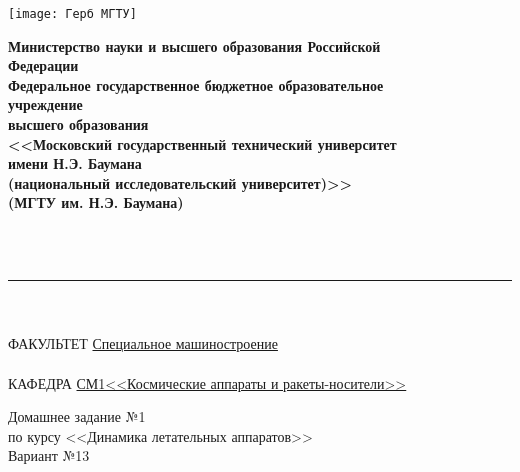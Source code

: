 \begin{minipage}{0.2\linewidth}
    \texttt{[image: Герб МГТУ]}
\end{minipage}
\begin{minipage}{0.8\linewidth}
    \begin{center}
        \begin{singlespace}
            \textbf{Министерство науки и высшего образования Российской \\ Федерации \\ Федеральное государственное бюджетное образовательное \\ учреждение \\ высшего образования \\ <<Московский государственный технический университет \\ имени Н.Э. Баумана \\ (национальный исследовательский университет)>> \\ (МГТУ им. Н.Э. Баумана)}
        \end{singlespace}
    \end{center}
\end{minipage}
\\
\\
\rule{\linewidth}{2pt} %
\\
\\
ФАКУЛЬТЕТ \underline{\hspace{0.25\linewidth} Специальное машиностроение \hspace{0.25\linewidth}}
\\
\\
КАФЕДРА \underline{\hspace{0.16\linewidth} СМ1<<Космические аппараты и ракеты-носители>> \hspace{0.16\linewidth}}
\\
\vspace{3.5cm}
\begin{center}
    \begin{minipage}{0.8\linewidth}
        \begin{center}
            \large Домашнее задание №1 \\ по курсу <<Динамика летательных аппаратов>>
            \\[10pt]
            \large Вариант №13
        \end{center}
    \end{minipage}
\end{center}

